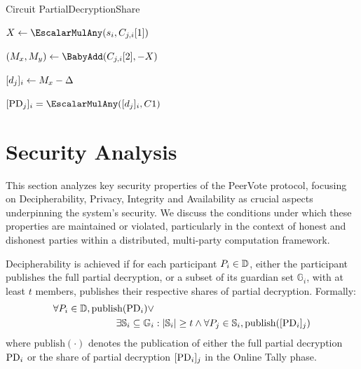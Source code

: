 \documentclass[runningheads]{llncs}
\begin{document}
\begin{algorithm}[H]
\caption{Circuit PartialDecryptionShare}
\label{alg:circuit_proof_pds}


\BlankLine

$X \leftarrow \EscalarMulAny(\PartySecretKey{i}, \EncryptedPartialDecryptionKeyShare{j}{i}[1])$\; %

$(M_x, M_y) \leftarrow \BabyAdd(\EncryptedPartialDecryptionKeyShare{j}{i}[2], - X)$\; %

$[d_{j}]_{i} \leftarrow M_x - \Delta$\;

\Assert $\SharePartialDecryptionFromTo{j}{i} = \EscalarMulAny(\PartialDecryptionKeyShare{j}{i}, \TotalA{})$
\end{algorithm}



\section{Security Analysis}

This section analyzes key security properties of the PeerVote protocol, focusing on Decipherability, Privacy, Integrity and Availability as crucial aspects underpinning the system's security. We discuss the conditions under which these properties are maintained or violated, particularly in the context of honest and dishonest parties within a distributed, multi-party computation framework.

\begin{definition}[Decipherability] \label{def:decipherability}
    Decipherability is achieved if for each participant $P_{i} \in \mathbb{D}$, either the participant publishes the full partial decryption, or a subset of its guardian set $\mathbb{G}_i$, with at least $t$ members, publishes their respective shares of partial decryption. Formally: 
    \begin{align*}\forall P_{i} \in \mathbb{D},  \textrm{publish}(\mathrm{PD}_{i}) \lor & \\ \exists \mathbb{S}_i \subseteq  \mathbb{G}_i & : |\mathbb{S}_i| \geq t \land \forall P_{j} \in \mathbb{S}_i, \textrm{publish}([\mathrm{PD}_{i}]_{j}) \end{align*}
    where \(\textrm{publish}(\cdot)\) denotes the publication of either the full partial decryption $\mathrm{PD}_{i}$ or the share of partial decryption $[\mathrm{PD}_{i}]_{j}$ in the Online Tally phase.
\end{definition}
\end{document}
